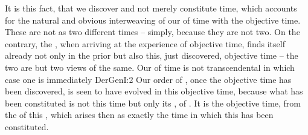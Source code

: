 It is this fact, that we discover and not merely constitute time, which accounts
for the natural and obvious interweaving of our  of time with the
objective time. These are not  as two different times -- simply,
because they are not two. On the contrary, the , when
arriving at the experience of objective time, finds itself already not only in
the prior  but also  this, just discovered, objective
time -- the two are but two views of the same. Our  of time is
not transcendental in which case one is immediately \citet{referred back to the
  crucial problem, that of time of transcendental constitution. According to
  which time does it take place? Is it a time itself constituted by an atemporal
  subject? Is the subject itself temporal?}{DerGen}{I:2} Our order
of , once the objective time has been discovered, is seen to have
evolved in this objective time, because what has been constituted is not this
time  but only its , 
of . It is the objective time,  from
the  of this , which arises then as
exactly the time in which this  has been constituted.


